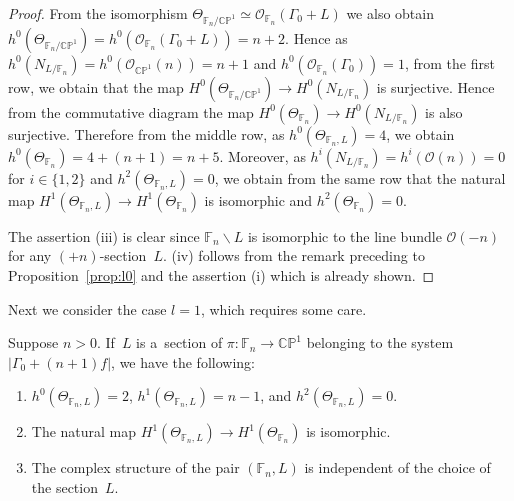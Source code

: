 \begin{proof}
From the isomorphism $\Theta_{\mathbb{F}_n/\mathbb{CP}^1}\simeq \mathscr O_{\mathbb{F}_n}(\Gamma_0+ L )$ we also obtain
$h^0(\Theta_{\mathbb{F}_n/\mathbb{CP}^1}) = h^0(\mathscr O_{\mathbb{F}_n}(\Gamma_0+ L )) = n + 2$.
Hence as $h^0(N_{ L /\mathbb{F}_n}) =h^0(\mathscr O_{\mathbb{CP}^1}(n)) = n+1$ and $h^0(\mathscr
O_{\mathbb{F}_n}(\Gamma_0)) = 1$, from the f\/irst row, we obtain that the map $H^0( \Theta_{\mathbb{F}_n/\mathbb{CP}^1}
) \to H^0(N_{ L /\mathbb{F}_n})$ is surjective.
Hence from the commutative diagram the map $H^0( \Theta_{\mathbb{F}_n} ) \to H^0(N_{ L /\mathbb{F}_n})$ is also
surjective.
Therefore from the middle row, as $h^0(\Theta_{\mathbb{F}_n,L}) = 4 $, we obtain $h^0(\Theta_{\mathbb{F}_n}) = 4 + (n+1)
= n+5$.
Moreover, as $h^i(N_{L/\mathbb{F}_n}) = h^i(\mathscr O(n))=0$ for $i\in\{1,2\}$ and $h^2(\Theta_{\mathbb{F}_n,L}) = 0$,
we obtain from the same row that the natural map $H^1(\Theta_{\mathbb{F}_n,L})\to H^1(\Theta_{\mathbb{F}_n})$ is
isomorphic and $h^2(\Theta_{\mathbb{F}_n})=0$.

The assertion (iii)
is clear since $\mathbb{F}_n\backslash L$ is isomorphic to the line bundle $\mathscr O(-n)$ for any
$(+n)$-section~$L$.
(iv) follows from the remark preceding to Proposition~\ref{prop:l0} and the assertion (i) which is already shown.
\end{proof}

Next we consider the case $l=1$, which requires some care.

\begin{Proposition}\label{prop:l1}
Suppose $n>0$.
If~$L$ is a~section of $\pi:\mathbb{F}_n\to\mathbb{CP}^1$ belonging to the system $|\Gamma_0 + (n+1)f|$, we have the following:
\begin{enumerate}\itemsep=0pt
\item[$(i)$] $ h^0(\Theta_{\mathbb{F}_n,L})=2$, $h^1(\Theta_{\mathbb{F}_n,L})= n-1$, and $h^2(\Theta_{\mathbb{F}_n,L})= 0$.
\item[$(ii)$] The natural map $H^1(\Theta_{\mathbb{F}_n,L})\to H^1(\Theta_{\mathbb{F}_n})$ is isomorphic.
\item[$(iii)$] The complex structure of the pair $(\mathbb{F}_n,L)$ is independent of the choice of the section~$L$.
\end{enumerate}
\end{Proposition}

